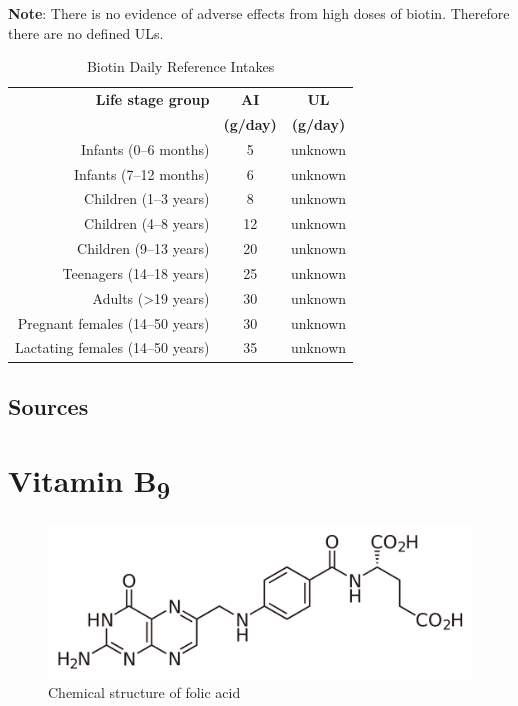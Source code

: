 \documentclass{book}
\begin{document}
\textbf{Note}: There is no evidence of adverse effects from high doses of biotin. Therefore there are no defined ULs.

\begin{table}[h]
	\caption{Biotin Daily Reference Intakes}
	\centering \begin{tabular}{| r | c | c |}
		\hline
		\textbf{Life stage group} & \textbf{AI} & \textbf{UL}\\
		& \textbf{(\textmu g/day)} & \textbf{(\textmu g/day)}\\ \hline
		Infants (0--6 months) & 5 & unknown\\ \hline
		Infants (7--12 months) & 6 & unknown\\ \hline
		Children (1--3 years) & 8 & unknown\\ \hline
		Children (4--8 years) & 12 & unknown\\ \hline
		Children (9--13 years) & 20 & unknown\\ \hline
		Teenagers (14--18 years) & 25 & unknown\\ \hline
		Adults (\textgreater19 years) & 30 & unknown\\ \hline
		Pregnant females (14--50 years) & 30 & unknown\\ \hline
		Lactating females (14--50 years) & 35 & unknown\\ \hline
	\end{tabular}
\end{table}
\newpage

\section{Sources}


\chapter{Vitamin B\textsubscript{9}}
\begin{figure}[h]
	\caption{Chemical structure of folic acid}
	\centering \includegraphics[width=\textwidth]{images/Vitamin_B9_chemical_structure}
\end{figure}
\newpage
\end{document}
